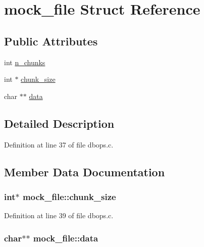 \hypertarget{structmock__file}{\section{mock\-\_\-file Struct Reference}
\label{structmock__file}
}
\subsection*{Public Attributes}
\begin{DoxyCompactItemize}
\item 
int \hyperlink{structmock__file_a18485ea7673b7336615d1a47ce8169eb}{n\-\_\-chunks}
\item 
int $\ast$ \hyperlink{structmock__file_af9e3c42975e1019a49350ee67d333640}{chunk\-\_\-size}
\item 
char $\ast$$\ast$ \hyperlink{structmock__file_ad60565b8d3cf1ee0c860031f7a72c899}{data}
\end{DoxyCompactItemize}


\subsection{Detailed Description}


Definition at line 37 of file dbops.\-c.



\subsection{Member Data Documentation}
\hypertarget{structmock__file_af9e3c42975e1019a49350ee67d333640}{
\subsubsection[{chunk\-\_\-size}]{\setlength{\rightskip}{0pt plus 5cm}int$\ast$ mock\-\_\-file\-::chunk\-\_\-size}}\label{structmock__file_af9e3c42975e1019a49350ee67d333640}


Definition at line 39 of file dbops.\-c.

\hypertarget{structmock__file_ad60565b8d3cf1ee0c860031f7a72c899}{
\subsubsection[{data}]{\setlength{\rightskip}{0pt plus 5cm}char$\ast$$\ast$ mock\-\_\-file\-::data}}\label{structmock__file_ad60565b8d3cf1ee0c860031f7a72c899}



